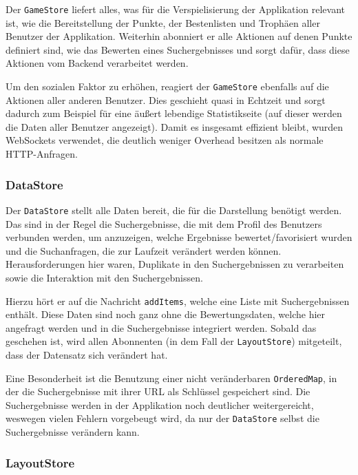 \documentclass[12pt,twoside]{book}
\begin{document}
Der \texttt{GameStore} liefert alles, was für die Verspielisierung der Applikation relevant ist, wie die Bereitstellung der Punkte, der Bestenlisten und Trophäen aller Benutzer der Applikation. Weiterhin abonniert er alle Aktionen auf denen Punkte definiert sind, wie das Bewerten eines Suchergebnisses und sorgt dafür, dass diese Aktionen vom Backend verarbeitet werden.

Um den sozialen Faktor zu erhöhen, reagiert der \texttt{GameStore} ebenfalls auf die Aktionen aller anderen Benutzer. Dies geschieht quasi in Echtzeit und sorgt dadurch zum Beispiel für eine äußert lebendige Statistikseite (auf dieser werden die Daten aller Benutzer angezeigt).
Damit es insgesamt effizient bleibt, wurden WebSockets verwendet, die deutlich weniger \glqq Overhead\grqq{} besitzen als normale HTTP-Anfragen.

\subsubsection*{DataStore}

Der \texttt{DataStore} stellt alle Daten bereit, die für die Darstellung benötigt werden. Das sind in der Regel die Suchergebnisse, die mit dem Profil des Benutzers verbunden werden, um anzuzeigen, welche Ergebnisse bewertet/favorisiert wurden und die Suchanfragen, die zur Laufzeit verändert werden können. Herausforderungen hier waren, Duplikate in den Suchergebnissen zu verarbeiten sowie die Interaktion mit den Suchergebnissen.

Hierzu hört er auf die Nachricht \texttt{addItems}, welche eine Liste mit Suchergebnissen enthält. Diese Daten sind noch ganz ohne die Bewertungsdaten, welche hier angefragt werden und in die Suchergebnisse integriert werden. Sobald das geschehen ist, wird allen Abonnenten (in dem Fall der \texttt{LayoutStore}) mitgeteilt, dass der Datensatz sich verändert hat.

Eine Besonderheit ist die Benutzung einer nicht veränderbaren \texttt{OrderedMap}, in der die Suchergebnisse mit ihrer URL als Schlüssel gespeichert sind. Die Suchergebnisse werden in der Applikation noch deutlicher weitergereicht, weswegen vielen Fehlern vorgebeugt wird, da nur der \texttt{DataStore} selbst die Suchergebnisse verändern kann.

\subsubsection*{LayoutStore}
\end{document}
